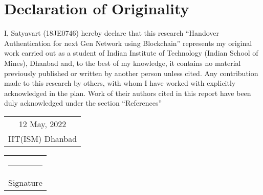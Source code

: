 
\chapter*{\centering Declaration of Originality}
{I, Satyavart (18JE0746) hereby declare that this research “Handover Authentication for next Gen Network using Blockchain” represents my original work carried out as a student of Indian Institute of Technology (Indian School of Mines), Dhanbad and, to the best of my knowledge, it contains no material previously published or written by another person unless cited. Any contribution made to this research by others, with whom I have worked with explicitly acknowledged in the plan. Work of their authors cited in this report have been duly acknowledged under the section “References”}

\vspace*{4em}
\begin{tabular}[t]{c}
  {12 May, 2022}\\{IIT(ISM) Dhanbad}
\end{tabular}%
\hfill%
\begin{tabular}[t]{c}
  \rule{10em}{0.4pt}\\ Signature
\end{tabular}%